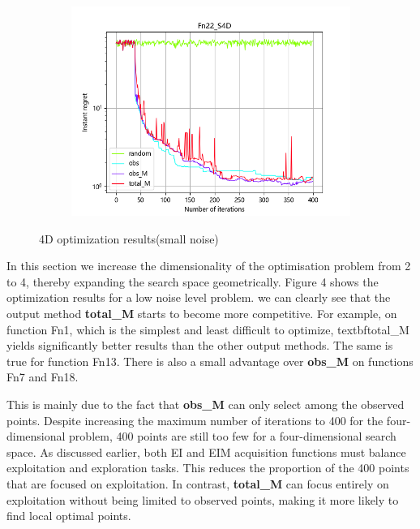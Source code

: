 \documentclass{article}
\begin{document}
\begin{figure}[H]
\begin{subfigure}[t]{.32\linewidth}
        \includegraphics[width=1\textwidth]{pictures/Homo_noise_4D/S/Fn22_S4D_ins.png}
    \end{subfigure}
    \caption{4D optimization results(small noise)}
    \label{Fig4}
\end{figure}

\hspace{2em}In this section we increase the dimensionality of the optimisation problem from 2 to 4, thereby expanding the search space geometrically. Figure 4 shows the optimization results for a low noise level problem. we can clearly see that the output method \textbf{total\_M} starts to become more competitive. For example, on function Fn1, which is the simplest and least difficult to optimize, textbf{total\_M} yields significantly better results than the other output methods. The same is true for function Fn13. There is also a small advantage over \textbf{obs\_M} on functions Fn7 and Fn18. 

\hspace{2em}This is mainly due to the fact that \textbf{obs\_M} can only select among the observed points. Despite increasing the maximum number of iterations to 400 for the four-dimensional problem, 400 points are still too few for a four-dimensional search space.  As discussed earlier, both EI and EIM acquisition functions must balance exploitation and exploration tasks. This reduces the proportion of the 400 points that are focused on exploitation. In contrast, \textbf{total\_M} can focus entirely on exploitation without being limited to observed points, making it more likely to find local optimal points. 
\end{document}
